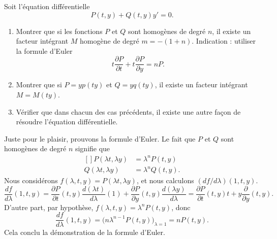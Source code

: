 

\begin{exercice}\label{exo_II-1-12}

Soit l'équation différentielle
\begin{equation}
	P(t,y)+Q(t,y)y'=0.
\end{equation}
\begin{enumerate}
\item
Montrer que si les fonctions $P$ et $Q$ sont homogènes de degré $n$, il existe un facteur intégrant $M$ homogène de degré $m=-(1+n)$. Indication : utiliser la formule d'Euler
\begin{equation}
	t\frac{ \partial P }{ \partial t }+t\frac{ \partial P }{ \partial y }=nP.
\end{equation}

\item
Montrer que si $P=yp(ty)$ et $Q=yq(ty)$, il existe un facteur intégrant $M=M(ty)$.

\item
Vérifier que dans chacun des cas précédents, il existe une autre façon de résoudre l'équation différentielle.

\end{enumerate}

\end{exercice}

Juste pour le plaisir, prouvons la formule d'Euler. Le fait que $P$ et $Q$ sont homogènes de degré $n$ signifie que
\begin{equation}
	\begin{aligned}[]
		P(\lambda t,\lambda y)	&=\lambda^nP(t,y)\\
		Q(\lambda t,\lambda y)	&=\lambda^nQ(t,y).
	\end{aligned}
\end{equation}
Nous considérons $f(\lambda,t,y)=P(\lambda t,\lambda y)$, et nous calculons $(df/d\lambda)(1,t,y)$.
\begin{equation}
	\frac{ df }{ d\lambda }(1,t,y)=\frac{ \partial P }{ \partial t }(t,y)\frac{ d(\lambda t) }{ d\lambda }(1)+\frac{ \partial P }{ \partial y }(t,y)\frac{ d(\lambda y) }{ d\lambda }=\frac{ \partial P }{ \partial t }(t,y)t+y\frac{ \partial  }{ \partial y }(t,y).
\end{equation}
D'autre part, par hypothèse, $f(\lambda,t,y)=\lambda^nP(t,y)$, donc
\begin{equation}
	\frac{ df }{ d\lambda }(1,t,y)=\big( n\lambda^{n-1}P(t,y) \big)_{\lambda=1}=nP(t,y).
\end{equation}
Cela conclu la démonstration de la formule d'Euler.



